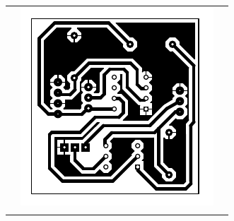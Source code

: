 \begin{tabular}{ccc}
\begin{minipage}{0.32\textwidth}
  \end{minipage} &
  \begin{minipage}{0.32\textwidth}
    \centering
    \includegraphics[width=\textwidth,height=0.2\textheight,keepaspectratio]{PCBS/Comparador PCB.pdf} %
  \end{minipage} \\
  
  \vspace{1em} %
  

\end{tabular}
